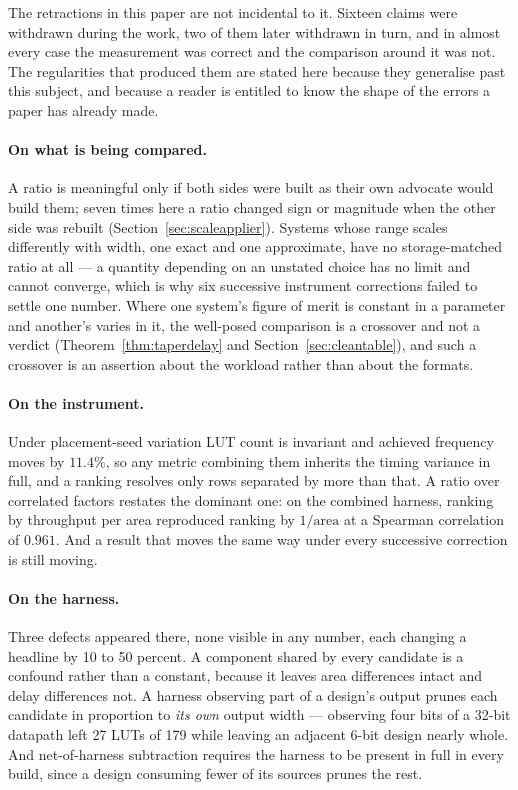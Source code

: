 \documentclass[11pt]{article}
\theoremstyle{definition}
\begin{document}
The retractions in this paper are not incidental to it. Sixteen claims were
withdrawn during the work, two of them later withdrawn in turn, and in almost
every case the measurement was correct and the comparison around it was not. The
regularities that produced them are stated here because they generalise past this
subject, and because a reader is entitled to know the shape of the errors a paper
has already made.

\paragraph{On what is being compared.} A ratio is meaningful only if both sides
were built as their own advocate would build them; seven times here a ratio
changed sign or magnitude when the other side was rebuilt
(Section~\ref{sec:scaleapplier}). Systems whose range scales differently with
width, one exact and one approximate, have no storage-matched ratio at all --- a
quantity depending on an unstated choice has no limit and cannot converge, which
is why six successive instrument corrections failed to settle one number. Where
one system's figure of merit is constant in a parameter and another's varies in
it, the well-posed comparison is a crossover and not a verdict
(Theorem~\ref{thm:taperdelay} and Section~\ref{sec:cleantable}), and such a
crossover is an assertion about the workload rather than about the formats.

\paragraph{On the instrument.} Under placement-seed variation LUT count is
invariant and achieved frequency moves by $11.4\%$, so any metric combining them
inherits the timing variance in full, and a ranking resolves only rows separated
by more than that. A ratio over correlated factors restates the dominant one: on
the combined harness, ranking by throughput per area reproduced ranking by
$1/\text{area}$ at a Spearman correlation of $0.961$. And a result that moves the
same way under every successive correction is still moving.

\paragraph{On the harness.} Three defects appeared there, none visible in any
number, each changing a headline by 10 to 50 percent. A component shared by every
candidate is a confound rather than a constant, because it leaves area
differences intact and delay differences not. A harness observing part of a
design's output prunes each candidate in proportion to \emph{its own} output
width --- observing four bits of a 32-bit datapath left 27 LUTs of 179 while
leaving an adjacent 6-bit design nearly whole. And net-of-harness subtraction
requires the harness to be present in full in every build, since a design
consuming fewer of its sources prunes the rest.
\end{document}
